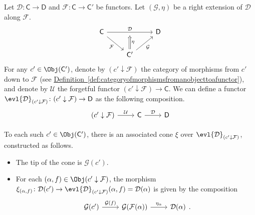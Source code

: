 \documentclass[notes.tex]{subfiles}
\begin{document}
Let $\mathcal{D}\colon \mathsf{C} \to \mathsf{D}$ and $\mathcal{F}\colon \mathsf{C} \to \mathsf{C'}$ be functors. Let $(\mathcal{G}, \eta)$ be a right extension of $\mathcal{D}$ along $\mathcal{F}$.
\begin{equation*}
  \begin{tikzcd}
    \mathsf{C}
    \arrow[dr, swap, "\mathcal{F}"]
    \arrow[rr, "\mathcal{D}", ""'{name=U}]
    && \mathsf{D}
    \\
    & \mathsf{C'}
    \arrow[ur, swap, "\mathcal{G}"]
    \arrow[d, to=U, Rightarrow, swap, "\eta"]
  \end{tikzcd}
\end{equation*}
For any $c' \in \Obj(\mathsf{C}')$, denote by $(c' \downarrow \mathcal{F})$ the category of morphisms from $c'$ down to $\mathcal{F}$ (see \hyperref[def:categoryofmorphismsfromanobjecttoafunctor]{Definition~\ref*{def:categoryofmorphismsfromanobjecttoafunctor}}), and denote by $\mathcal{U}$ the forgetful functor $(c' \downarrow \mathcal{F}) \to \mathsf{C}$. We can define a functor $\evl{\mathcal{D}}_{(c' \downarrow \mathcal{F})}\colon (c' \downarrow \mathcal{F}) \to \mathsf{D}$ as the following composition.
\begin{equation*}
  \begin{tikzcd}
    (c' \downarrow \mathcal{F})
    \arrow[r, "\mathcal{U}"]
    & \mathsf{C}
    \arrow[r, "\mathcal{D}"]
    & \mathsf{D}
  \end{tikzcd}
\end{equation*}

To each such $c' \in \Obj(\mathsf{C}')$, there is an associated cone $\xi$ over $\evl{\mathcal{D}}_{(c' \downarrow \mathcal{F})}$, constructed as follows.

\begin{itemize}
  \item The tip of the cone is $\mathcal{G}(c')$.

  \item For each $(\alpha, f) \in \Obj(c' \downarrow \mathcal{F})$, the morphism $\xi_{(\alpha, f)}\colon\mathcal{D}(c') \to \evl{\mathcal{D}}_{(c' \downarrow \mathcal{F})}(\alpha, f) = \mathcal{D}(\alpha)$ is given by the composition
    \begin{equation*}
      \begin{tikzcd}
        \mathcal{G}(c')
        \arrow[r, "\mathcal{G}(f)"]
        & \mathcal{G}(\mathcal{F}(\alpha))
        \arrow[r, "\eta_{\alpha}"]
        & \mathcal{D}(\alpha)
      \end{tikzcd}.
    \end{equation*}
\end{itemize}
\end{document}
